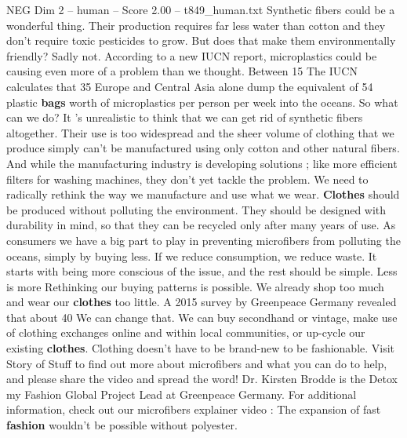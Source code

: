 \begin{textsample}{NEG Dim 2 – human – Score 2.00 – t849\_human.txt}  \label{ex:f2_neg_040}
Synthetic fibers could be a wonderful thing.
Their production requires far less water than cotton and they don't require toxic pesticides to grow.
But does that make them environmentally friendly?
Sadly not.
According to a new IUCN report, microplastics could be causing even more of a problem than we thought.
Between 15 %
The IUCN calculates that 35 %
Europe and Central Asia alone dump the equivalent of 54 plastic \textbf{bags} worth of microplastics per person per week into the oceans.
So what can we do?
It ’s unrealistic to think that we can get rid of synthetic fibers altogether.
Their use is too widespread and the sheer volume of clothing that we produce simply can't be manufactured using only cotton and other natural fibers.
And while the manufacturing industry is developing solutions ; like more efficient filters for washing machines, they don't yet tackle the problem.
We need to radically rethink the way we manufacture and use what we wear. \textbf{Clothes} should be produced without polluting the environment.
They should be designed with durability in mind, so that they can be recycled only after many years of use.
As consumers we have a big part to play in preventing microfibers from polluting the oceans, simply by buying less.
If we reduce consumption, we reduce waste.
It starts with being more conscious of the issue, and the rest should be simple.
Less is more Rethinking our buying patterns is possible.
We already shop too much and wear our \textbf{clothes} too little.
A 2015 survey by Greenpeace Germany revealed that about 40 %
We can change that.
We can buy secondhand or vintage, make use of clothing exchanges online and within local communities, or up-cycle our existing \textbf{clothes}.
Clothing doesn't have to be brand-new to be fashionable.
Visit Story of Stuff to find out more about microfibers and what you can do to help, and please share the video and spread the word!
Dr.
Kirsten Brodde is the Detox my Fashion Global Project Lead at Greenpeace Germany.
For additional information, check out our microfibers explainer video : The expansion of fast \textbf{fashion} wouldn't be possible without polyester.

\end{textsample}

